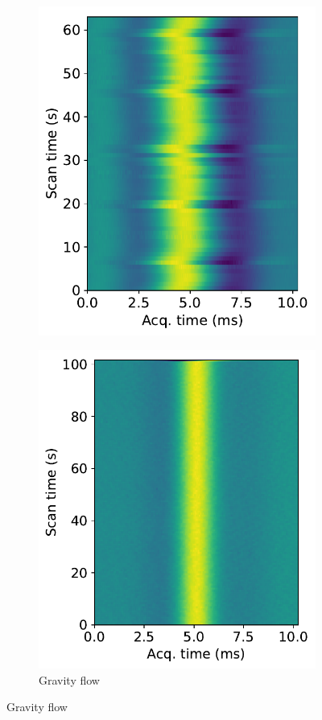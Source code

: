 \begin{figure}[ht]
\begin{subfigure}[t]{0.32\textwidth}
\includegraphics[width=\textwidth]{figures/contflow/flowstabilitybadpump.pdf}
\end{subfigure}
\begin{subfigure}[t]{0.32\textwidth}
\caption{Gravity flow}
\includegraphics[width=\textwidth]{figures/contflow/flowstabilitynewsetup.pdf}
\end{subfigure}


\end{figure}

